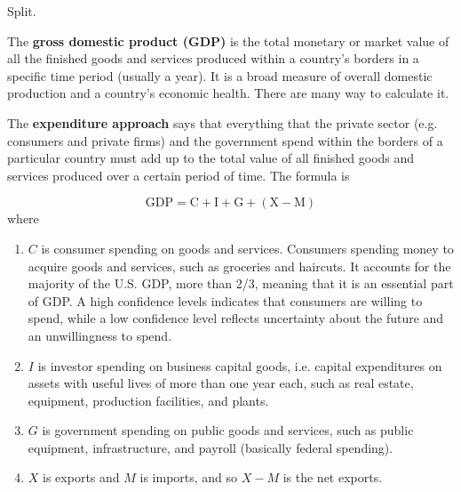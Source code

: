 \documentclass{article}
\begin{document}
  Split. 

  The \textbf{gross domestic product (GDP)} is the total monetary or market value of all the finished goods and services produced within a country's borders in a specific time period (usually a year). It is a broad measure of overall domestic production and a country's economic health. There are many way to calculate it.

  The \textbf{expenditure approach} says that everything that the private sector (e.g. consumers and private firms) and the government spend within the borders of a particular country must add up to the total value of all finished goods and services produced over a certain period of time. The formula is

  \begin{equation}
    \text{GDP} = \text{C} + \text{I} + \text{G} + (\text{X} - \text{M})
  \end{equation}
  where
  \begin{enumerate}
    \item $C$ is consumer spending on goods and services. Consumers spending money to acquire goods and services, such as groceries and haircuts. It accounts for the majority of the U.S. GDP, more than 2/3, meaning that it is an essential part of GDP. A high confidence levels indicates that consumers are willing to spend, while a low confidence level reflects uncertainty about the future and an unwillingness to spend.
    \item $I$ is investor spending on business capital goods, i.e. capital expenditures on assets with useful lives of more than one year each, such as real estate, equipment, production facilities, and plants.
    \item $G$ is government spending on public goods and services, such as public equipment, infrastructure, and payroll (basically federal spending).
    \item $X$ is exports and $M$ is imports, and so $X - M$ is the net exports.
  \end{enumerate}
\end{document}
